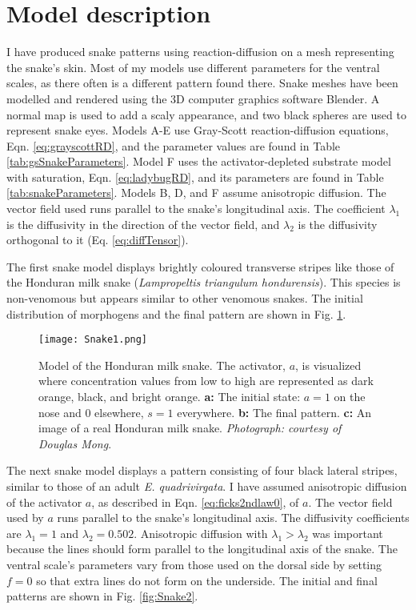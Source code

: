 \section{Model description}
I have produced snake patterns using reaction-diffusion on a mesh representing the snake's skin. Most of my models use different parameters for the ventral scales, as there often is a different pattern found there. Snake meshes have been modelled and rendered using the 3D computer graphics software Blender. A normal map is used to add a scaly appearance, and two black spheres are used to represent snake eyes. Models A-E use Gray-Scott reaction-diffusion equations, Eqn. \ref{eq:grayscottRD}, and the parameter values are found in Table \ref{tab:gsSnakeParameters}. Model F uses the activator-depleted substrate model with saturation, Eqn. \ref{eq:ladybugRD}, and its parameters are found in Table \ref{tab:snakeParameters}. Models B, D, and F assume anisotropic diffusion. The vector field used runs parallel to the snake's longitudinal axis. The coefficient $\lambda_{1}$ is the diffusivity in the direction of the vector field, and $\lambda_{2}$ is the diffusivity orthogonal to it (Eq. \ref{eq:diffTensor}). 

\newpage
The first snake model displays brightly coloured transverse stripes like those of the Honduran milk snake (\textit{Lampropeltis triangulum hondurensis}). This species is non-venomous but appears similar to other venomous snakes. The initial distribution of morphogens and the final pattern are shown in Fig. \ref{fig:Snake1}.

\begin{figure}[ht]
	\centering
	\texttt{[image: Snake1.png]}
	\caption{Model of the Honduran milk snake. The activator, $a$, is visualized where concentration values from low to high are represented as dark orange, black, and bright orange. \textbf{a:} The initial state: $a=1$ on the nose and $0$ elsewhere, $s=1$ everywhere. \textbf{b:} The final pattern. \textbf{c:} An image of a real Honduran milk snake. \textit{Photograph: courtesy of Douglas Mong}.}
	\label{fig:Snake1}
\end{figure}

The next snake model displays a pattern consisting of four black lateral stripes, similar to those of an adult \textit{E. quadrivirgata}. I have assumed anisotropic diffusion of the activator $a$, as described in Eqn. \ref{eq:ficks2ndlaw0}, of $a$. The vector field used by $a$ runs parallel to the snake's longitudinal axis. The diffusivity coefficients are $\lambda_{1}=1$ and $\lambda_{2}=0.502$. Anisotropic diffusion with $\lambda_{1} > \lambda_{2}$ was important because the lines should form parallel to the longitudinal axis of the snake. The ventral scale's parameters vary from those used on the dorsal side by setting $f=0$ so that extra lines do not form on the underside. The initial and final patterns are shown in Fig. \ref{fig:Snake2}.

